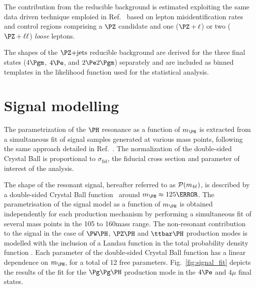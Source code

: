 The contribution from the reducible background is estimated exploiting the same data driven technique emploied in Ref.~\cite{CMSHIG19001} based on lepton misidentification rates and control regions comprising a $\PZ$ candidate and one ($\PZ+\ell$) or two ($\PZ+\ell\ell$) \textit{loose} leptons.

The shapes of the $\PZ\text{+jets}$ reducible background are derived for the three final states ($4\Pgm$, $4\Pe$, and $2\Pe 2\Pgm$) separately and are included as binned templates in the likelihood function used for the statistical analysis.

\section{Signal modelling}
\label{sec:signal}

The parametrization of the $\PH$ resonance as a function of $\mH$ is extracted from a simultaneous fit of signal samples generated at various mass points, following the same approach detailed in Ref.~\cite{CMSHIG19001}.
The normalization of the double-sided Crystal Ball is proportional to $\sigma_{\mathrm{fid}}$, the fiducial cross section and parameter of interest of the analysis.

The shape of the \PH resonant signal, hereafter referred to as $\mathcal{P}(m_{4\ell})$, is described by a double-sided Crystal Ball function~\cite{Oreglia:1980cs} around $\mH \approx 125\GeV$.
The parametrisation of the signal model as a function of $\mH$ is obtained independently for each production mechanism by performing a simultaneous fit of several mass points  in the 105 to 160\GeV mass range.
The non-resonant contribution to the signal in the case of $\WH$, $\ZH$ and $\ttH$ production modes is modelled with the inclusion of a  Landau function in the total probability density function . 
Each parameter of the double-sided Crystal Ball function has a linear dependence on $\mH$, for a total of 12 free parameters.
Fig.~\ref{fig:signal_fit} depicts the results of the fit for the $\ggH$ production mode in the $4\Pe$ and $4\mu$ final states. 

